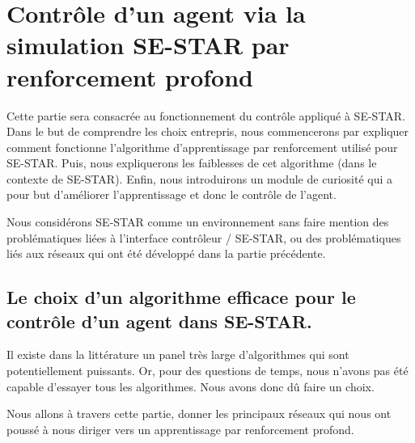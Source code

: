 \section{Contrôle d'un agent via la simulation SE-STAR par renforcement profond}

Cette partie sera consacrée au fonctionnement du contrôle appliqué à SE-STAR. Dans le but de comprendre les choix entrepris, nous commencerons par expliquer comment fonctionne l'algorithme d'apprentissage par renforcement utilisé pour SE-STAR. Puis, nous expliquerons les faiblesses de cet algorithme (dans le contexte de SE-STAR). Enfin, nous introduirons un module de curiosité qui a pour but d'améliorer l'apprentissage et donc le contrôle de l'agent.


Nous considérons SE-STAR comme un environnement sans faire mention des problématiques liées à l'interface contrôleur / SE-STAR, ou des problématiques liés aux réseaux qui ont été développé dans la partie précédente. 

\subsection{Le choix d'un algorithme efficace pour le contrôle d'un agent dans SE-STAR.}

Il existe dans la littérature un panel très large d'algorithmes qui sont potentiellement puissants. Or, pour des questions de temps, nous n'avons pas été capable d'essayer tous les algorithmes. Nous avons donc dû faire un choix. 

Nous allons à travers cette partie, donner les principaux réseaux qui nous ont poussé à nous diriger vers un apprentissage par renforcement profond. 

